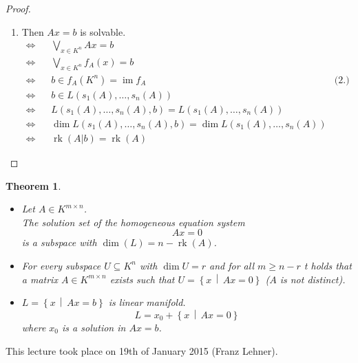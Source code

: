 \documentclass[a4paper,landscape,twocolumn]{article}
\newcommand\meta[3]{This #1 took place on #2 (#3).\par}
\newcommand\setdef[2]{\left\{#1\,\middle|\,#2\right\}}
\newtheorem{theorem}{Theorem}
\DeclareMathOperator\image{im} %
\begin{document}
\begin{proof}
  \begin{enumerate}
    \item Then $Ax = b$ is solvable.
      \begin{align*}
        \Leftrightarrow & \hspace{10pt} \bigvee_{x \in K^n} Ax = b \\
        \Leftrightarrow & \hspace{10pt} \bigvee_{x \in K^n} f_A(x) = b \\
        \Leftrightarrow & \hspace{10pt} b \in f_A(K^n) = \image{f_A} & \text{(2.)}\\
        \Leftrightarrow & \hspace{10pt} b \in L(s_1(A), \ldots, s_n(A)) \\
        \Leftrightarrow & \hspace{10pt} L(s_1(A), \ldots, s_n(A), b) = L(s_1(A), \ldots, s_n(A)) \\
        \Leftrightarrow & \hspace{10pt} \dim{L(s_1(A), \ldots, s_n(A), b)} = \dim{L(s_1(A), \ldots, s_n(A))} \\
        \Leftrightarrow & \hspace{10pt} \operatorname{rk}(A|b) = \operatorname{rk}(A)
      \end{align*}
  \end{enumerate}
\end{proof}

\begin{theorem}
  \label{satz-6.44}
  \begin{itemize}
    \item Let $A \in K^{m\times n}$. \\
      The solution set of the homogeneous equation system
      \[ Ax = 0 \]
      is a subspace with $\dim(L) = n - \operatorname{rk}(A)$.
    \item For every subspace $U \subseteq K^n$ with $\dim{U} = r$
      and for all $m \geq n - r$ t holds that a matrix $A \in K^{m \times n}$
      exists such that $U = \setdef{x}{Ax = 0}$ ($A$ is not distinct).
    \item $L = \setdef{x}{Ax = b}$ is linear manifold.
      \[ L = x_0 + \setdef{x}{Ax = 0} \]
      where $x_0$ is a solution in $Ax = b$.
  \end{itemize}
\end{theorem}

\meta{lecture}{19th of January 2015}{Franz Lehner}
\end{document}
